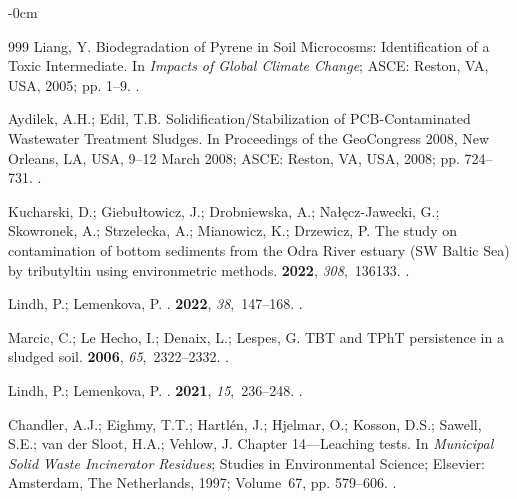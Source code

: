\documentclass[algorithms,article,accept,pdftex,moreauthors]{Definitions/mdpi}
\begin{document}
\begin{adjustwidth}{-\extralength}{0cm}
\begin{thebibliography}{999}
Liang, Y. Biodegradation of Pyrene in Soil Microcosms: Identification of a
  Toxic Intermediate.
\newblock In {\em Impacts of Global Climate Change}; ASCE: Reston, VA, USA, 2005; pp. 1--9. %
.

Aydilek, A.H.; Edil, T.B. Solidification/Stabilization of PCB-Contaminated
  Wastewater Treatment Sludges.
\newblock In Proceedings of the  GeoCongress 2008, New Orleans, LA, USA, 9--12 March 2008; ASCE: Reston, VA, USA, 2008; pp. 724--731. %
.

Kucharski, D.; Giebułtowicz, J.; Drobniewska, A.; Nałęcz-Jawecki, G.;
  Skowronek, A.; Strzelecka, A.; Mianowicz, K.; Drzewicz, P.
\newblock The study on contamination of bottom sediments from the Odra River
  estuary (SW Baltic Sea) by tributyltin using environmetric methods.
 {\bf 2022}, {\em 308},~136133.
.

Lindh, P.; Lemenkova, P.
.
 {\bf 2022}, {\em 38},~147--168.
.

Marcic, C.; {Le Hecho}, I.; Denaix, L.; Lespes, G.
\newblock TBT and TPhT persistence in a sludged soil.
 {\bf 2006}, {\em 65},~2322--2332.
.

Lindh, P.; Lemenkova, P.
.
 {\bf 2021}, {\em 15},~236--248.
.

Chandler, A.J.; Eighmy, T.T.; Hartlén, J.; Hjelmar, O.; Kosson, D.S.; Sawell,
  S.E.; {van der Sloot}, H.A.; Vehlow, J.
\newblock Chapter 14---Leaching tests. In {\em Municipal Solid Waste
  Incinerator Residues}; Studies in
  Environmental Science; Elsevier: Amsterdam, The Netherlands, %
 1997; Volume~67, pp. 579--606.
.


\end{thebibliography}
\end{adjustwidth}
\end{document}
